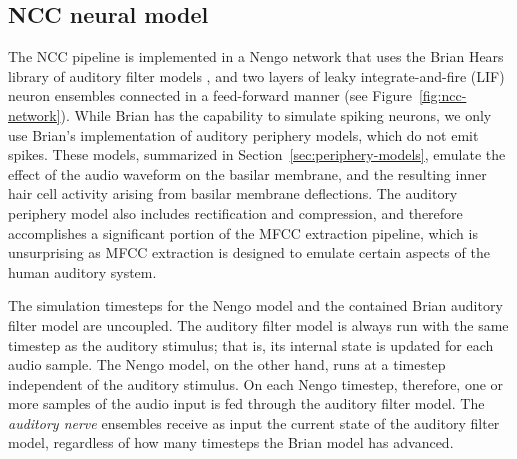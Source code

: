 \subsection{NCC neural model}
\label{sec:ncc-neural}

The NCC pipeline is implemented
in a Nengo network that uses
the Brian Hears library
of auditory filter models
\citep{fontaine2011},
and two layers of
leaky integrate-and-fire (LIF) neuron ensembles
connected in a feed-forward manner
(see Figure~\ref{fig:ncc-network}).
While Brian has the capability
to simulate spiking neurons,
we only use Brian's implementation of
auditory periphery models,
which do not emit spikes.
These models,
summarized in Section~\ref{sec:periphery-models},
emulate the effect of the
audio waveform on the basilar membrane,
and the resulting inner hair cell activity
arising from basilar membrane deflections.
The auditory periphery model
also includes rectification and compression,
and therefore accomplishes a significant portion
of the MFCC extraction pipeline,
which is unsurprising as MFCC extraction
is designed to emulate certain aspects
of the human auditory system.


The simulation timesteps
for the Nengo model and the contained
Brian auditory filter model
are uncoupled.
The auditory filter model
is always run with the same timestep
as the auditory stimulus;
that is, its internal state is updated
for each audio sample.
The Nengo model, on the other hand,
runs at a timestep independent
of the auditory stimulus.
On each Nengo timestep,
therefore, one or more samples
of the audio input
is fed through the
auditory filter model.
The \textit{auditory nerve} ensembles
receive as input the current
state of the auditory filter model,
regardless of how many timesteps
the Brian model has advanced.

